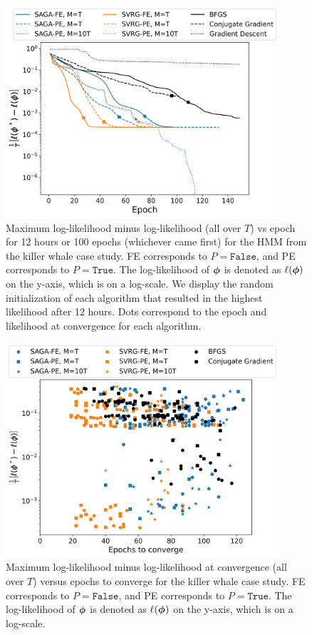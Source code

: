 \begin{figure}%
    \centering
    \includegraphics[width=4in]{../plt/log-like_v_epoch_K-3-3.png}
    \caption{
    Maximum log-likelihood minus log-likelihood (all over $T$) vs epoch for 12 hours or 100 epochs (whichever came first) for the HMM from the killer whale case study. FE corresponds to $P = \texttt{False}$, and PE corresponds to $P = \texttt{True}$. The log-likelihood of $\boldsymbol{\phi}$ is denoted as $\ell(\boldsymbol{\phi})$ on the y-axis, which is on a log-scale. We display the random initialization of each algorithm that resulted in the highest likelihood after 12 hours. Dots correspond to the epoch and likelihood at convergence for each algorithm.
    }
    \label{fig:ll_trace_case}
\end{figure}
%
\begin{figure}%
    \centering
    \includegraphics[width=4in]{../plt/scatterplot_case_study.png}
    \caption{Maximum log-likelihood minus log-likelihood at convergence (all over $T$) versus epochs to converge for the killer whale case study. FE corresponds to $P = \texttt{False}$, and PE corresponds to $P = \texttt{True}$. The log-likelihood of $\boldsymbol{\phi}$ is denoted as $\ell(\boldsymbol{\phi})$ on the y-axis, which is on a log-scale.}
    \label{fig:scatterplot_case}
\end{figure}
